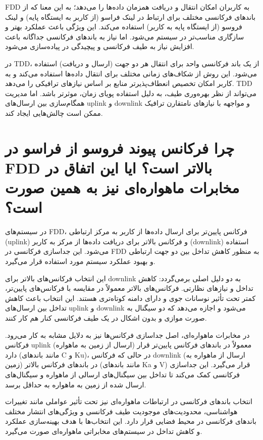 FDD به کاربران امکان انتقال و دریافت همزمان داده‌ها را می‌دهد؛ به این معنا که از باندهای فرکانسی مختلف برای ارتباط در لینک فراسو (از کاربر به ایستگاه پایه) و لینک فروسو (از ایستگاه پایه به کاربر) استفاده می‌کند. این ویژگی باعث عملکرد بهتر و سازگاری مناسب‌تر در سیستم می‌شود. اما نیاز به باندهای فرکانسی جداگانه باعث افزایش نیاز به طیف فرکانسی و پیچیدگی در پیاده‌سازی می‌شود.

در TDD، از یک باند فرکانسی واحد برای انتقال هر دو جهت (ارسال و دریافت) استفاده می‌شود. این روش از شکاف‌های زمانی مختلف برای انتقال داده‌ها استفاده می‌کند و به کاربر امکان تخصیص انعطاف‌پذیرتر منابع بر اساس نیازهای ترافیکی را می‌دهد. TDD می‌تواند از نظر بهره‌وری طیف، به دلیل استفاده پویای زمان، موثرتر باشد. اما مدیریت همگام‌سازی بین ارسال‌های uplink و downlink و مواجهه با نیازهای نامتقارن ترافیک ممکن است چالش‌هایی ایجاد کند.

\section{چرا فرکانس پیوند فروسو از فراسو در FDD بالاتر است؟ ایا این اتفاق در مخابرات ماهواره‌ای نیز به همین صورت است؟}

در سیستم‌های FDD، فرکانس پایین‌تر برای ارسال داده‌ها از کاربر به مرکز ارتباطی (uplink) و فرکانس بالاتر برای دریافت داده‌ها از مرکز به کاربر (downlink) استفاده می‌شود. این جداسازی فرکانسی در FDD به منظور کاهش تداخل بین دو جهت ارتباطی و بهبود عملکرد سیستم مورد استفاده قرار می‌گیرد.

این انتخاب فرکانس‌های بالاتر برای downlink به دو دلیل اصلی برمی‌گردد: کاهش تداخل و نیازهای نظارتی. فرکانس‌های بالاتر معمولاً در مقایسه با فرکانس‌های پایین‌تر، کمتر تحت تأثیر نوسانات جوی و دارای دامنه کوتاه‌تری هستند. این انتخاب باعث کاهش تداخل بین ارسال‌های uplink و downlink می‌شود و اجازه می‌دهد که دو سیگنال به صورت موازی و بدون اشکال در یک طیف فرکانسی کنار هم کار کنند.

در مخابرات ماهواره‌ای، اصل جداسازی فرکانس‌ها نیز به دلایل مشابه به کار می‌رود. فرکانس uplink (ارسال از زمین به ماهواره) معمولاً در باندهای فرکانس پایین‌تر قرار دارد (مانند باندهای C و Ku)، در حالی که فرکانس downlink (ارسال از ماهواره به زمین) در باندهای فرکانس بالاتر (مانند باندهای Ka و V) قرار می‌گیرد. این جداسازی فرکانسی کمک می‌کند تا تداخل بین سیگنال‌های ارسالی از ماهواره و سیگنال‌های ارسال شده از زمین به ماهواره به حداقل برسد.

انتخاب باندهای فرکانسی در ارتباطات ماهواره‌ای نیز تحت تأثیر عواملی مانند تغییرات هواشناسی، محدودیت‌های موجودیت طیف فرکانسی و ویژگی‌های انتشار مختلف باندهای فرکانسی در محیط فضایی قرار دارد. این انتخاب‌ها با هدف بهینه‌سازی عملکرد و کاهش تداخل در سیستم‌های مخابراتی ماهواره‌ای صورت می‌گیرد.



